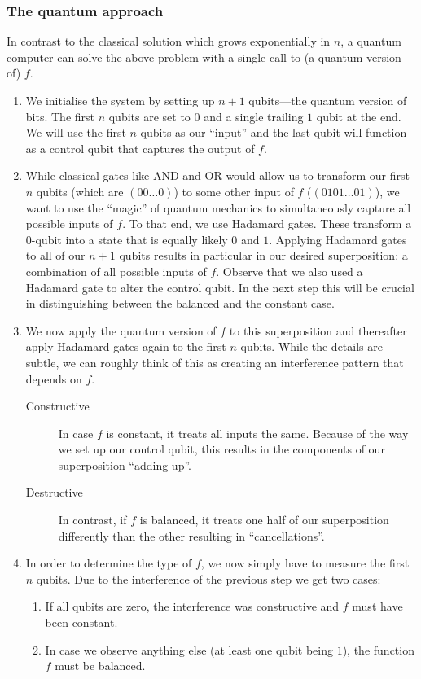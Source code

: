 \documentclass[a4paper,oneside, 12pt]{amsart}
\begin{document}
\subsubsection*{The quantum approach}
In contrast to the classical solution which grows exponentially in \(n\), a quantum computer can solve the above problem with a single call to (a quantum version of) \(f\).
\begin{enumerate}
  \item[Step 1:] We initialise the system by setting up \(n+1\) qubits---the quantum version of bits.
  The first \(n\) qubits are set to \(0\) and a single trailing \(1\) qubit at the end.
  We will use the first \(n\) qubits as our ``input'' and the last qubit will function as a control qubit that captures the output of \(f\).

  \item [Step 2:] While classical gates like AND and OR would allow us to transform our first \(n\) qubits (which are \((00\dots0)\)) to some other input of \(f\) (\eg \((0101\dots 01)\)), we want to use the ``magic'' of quantum mechanics to simultaneously capture all possible inputs of \(f\).
  To that end, we use Hadamard gates.
  These transform a \(0\)-qubit into a state that is equally likely \(0\)  and \(1\).
  Applying Hadamard gates to all of our \(n+1\) qubits results in particular in our desired superposition: a combination of all possible inputs of \(f\).
  Observe that we also used a Hadamard gate to alter the control qubit.
  In the next step this will be crucial in distinguishing between the balanced and the constant case.

  \item [Step 3:] We now apply the quantum version of \(f\) to this superposition and thereafter apply  Hadamard gates again to the first \(n\) qubits.
  While the details are subtle, we can roughly think of this as creating an interference pattern that depends on \(f\).
  \begin{description}
    \item [Constructive] In case \(f\) is constant, it treats all inputs the same.
    Because of the way we set up our control qubit, this results in the components of our superposition ``adding up''.
    \item [Destructive] In contrast, if \(f\) is balanced, it treats one half of our superposition differently than the other resulting in ``cancellations''.
  \end{description}


  \item [Step 4:] In order to determine the type of \(f\), we now simply have to measure the first \(n\) qubits.
  Due to the interference of the previous step we get two cases:
  \begin{enumerate}
    \item If all qubits are zero, the interference was constructive and \(f\) must have been constant.
    \item In case we observe anything else (at least one qubit being \(1\)), the function \(f\) must be balanced.
  \end{enumerate}
\end{enumerate}
\end{document}
